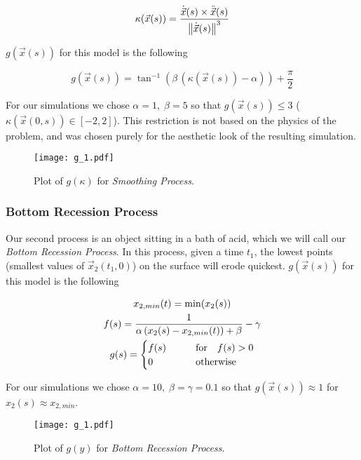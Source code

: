 \[
  \kappa(\vec{x}(s)) = \frac{\dot{\vec{x}}(s) \times \ddot{\vec{x}}(s)}{\norm{\dot{\vec{x}}(s)}^3}
\]

$g(\vec{x}(s))$ for this model is the following

\begin{equation}
  g(\vec{x}(s)) = \tan^{-1}(\beta \, (\kappa(\vec{x}(s)) - \alpha)) + \frac{\pi}{2}
\end{equation}

For our simulations we chose $\alpha = 1, \; \beta = 5$ so that $g(\vec{x}(s)) \le 3$ ($\kappa(\vec{x}(0, s)) \in [-2, 2]$). This restriction is not based on the physics of the problem, and was chosen purely for the aesthetic look of the resulting simulation.

\begin{figure}[H]
    \begin{center}
      \texttt{[image: g\_1.pdf]}
    \end{center}
  \vspace{-.2in} %
  \caption{\label{fig:g-1} Plot of $g(\kappa)$ for \textit{Smoothing Process}.}
\end{figure}

\subsubsection*{Bottom Recession Process}

Our second process is an object sitting in a bath of acid, which we will call our \textit{Bottom Recession Process}. In this process, given a time $t_1$, the lowest points (smallest values of $\vec{x}_2(t_1, 0)$) on the surface will erode quickest. $g(\vec{x}(s))$ for this model is the following

\begin{gather}
  x_{2, min}(t) = \min(x_2(s)) \notag\\
  f(s) = \frac{1}{\alpha \, (x_2(s) - x_{2, min}(t)) + \beta} - \gamma \notag\\
  g(s) = \begin{cases}
    f(s) \qquad &\text{for} \quad f(s) > 0\\
    0 \qquad &\text{otherwise}
  \end{cases}
\end{gather}

For our simulations we chose $\alpha = 10, \; \beta = \gamma = 0.1$ so that $g(\vec{x}(s)) \approx 1$ for $x_2(s) \approx x_{2,min}$.

\begin{figure}[H]
    \begin{center}
      \texttt{[image: g\_1.pdf]}
    \end{center}
  \vspace{-.2in} %
  \caption{\label{fig:g-2} Plot of $g(y)$ for \textit{Bottom Recession Process}.}
\end{figure}


